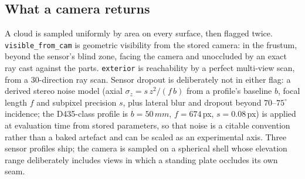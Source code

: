\documentclass[letterpaper, 10 pt, conference]{ieeeconf}
\newcommand{\mm}{\,mm}
\begin{document}
\subsection{What a camera returns}
A cloud is sampled uniformly by area on every surface, then flagged twice. \texttt{visible\_from\_cam} is geometric visibility from the stored camera: in the frustum, beyond the sensor's blind zone, facing the camera and unoccluded by an exact ray cast against the parts. \texttt{exterior} is reachability by a perfect multi-view scan, from a 30-direction ray scan. Sensor dropout is deliberately not in either flag: a derived stereo noise model (axial $\sigma_z = s\,z^2/(f\,b)$ from a profile's baseline $b$, focal length $f$ and subpixel precision $s$, plus lateral blur and dropout beyond $70$--$75^\circ$ incidence; the D435-class profile is $b=50\mm$, $f=674$\,px, $s=0.08$\,px) is applied at evaluation time from stored parameters, so that noise is a citable convention rather than a baked artefact and can be scaled as an experimental axis. Three sensor profiles ship; the camera is sampled on a spherical shell whose elevation range deliberately includes views in which a standing plate occludes its own seam.
\end{document}
